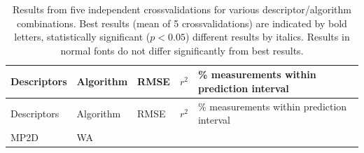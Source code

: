 \documentclass[utf8]{frontiersHLTH} %
\begin{document}
\begin{longtable}[]{@{}lllll@{}}
\caption{Results from five independent crossvalidations for various
descriptor/algorithm combinations. Best results (mean of 5
crossvalidations) are indicated by bold letters, statistically
significant (\(p<0.05\)) different results by italics. Results in normal
fonts do not differ significantly from best results. }\tabularnewline
\toprule
\begin{minipage}[b]{0.13\columnwidth}\raggedright\strut
Descriptors\strut
\end{minipage} & \begin{minipage}[b]{0.08\columnwidth}\raggedright\strut
Algorithm\strut
\end{minipage} & \begin{minipage}[b]{0.19\columnwidth}\raggedright\strut
RMSE\strut
\end{minipage} & \begin{minipage}[b]{0.19\columnwidth}\raggedright\strut
\(r^2\)\strut
\end{minipage} & \begin{minipage}[b]{0.27\columnwidth}\raggedright\strut
\% measurements within prediction interval\strut
\end{minipage}\tabularnewline
\midrule
\endfirsthead
\toprule
\begin{minipage}[b]{0.13\columnwidth}\raggedright\strut
Descriptors\strut
\end{minipage} & \begin{minipage}[b]{0.08\columnwidth}\raggedright\strut
Algorithm\strut
\end{minipage} & \begin{minipage}[b]{0.19\columnwidth}\raggedright\strut
RMSE\strut
\end{minipage} & \begin{minipage}[b]{0.19\columnwidth}\raggedright\strut
\(r^2\)\strut
\end{minipage} & \begin{minipage}[b]{0.27\columnwidth}\raggedright\strut
\% measurements within prediction interval\strut
\end{minipage}\tabularnewline
\midrule
\endhead
\begin{minipage}[t]{0.13\columnwidth}\raggedright\strut
MP2D\strut
\end{minipage} & \begin{minipage}[t]{0.08\columnwidth}\raggedright\strut
WA\strut
\end{minipage} & \begin{minipage}[t]{0.19\columnwidth}\raggedright\strut

\end{minipage}
\end{longtable}
\end{document}
